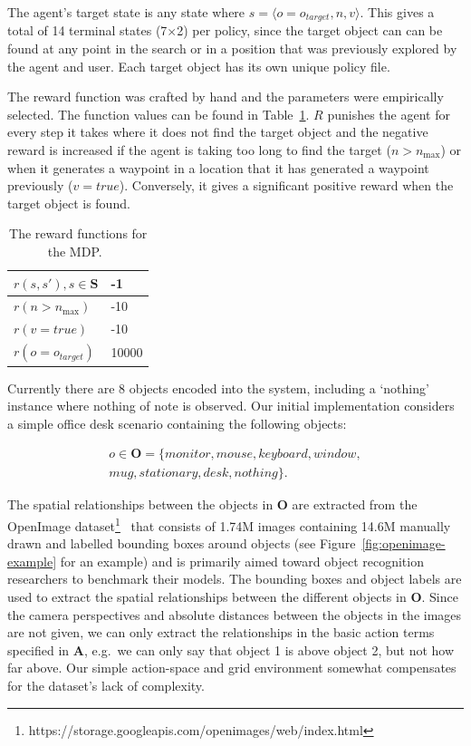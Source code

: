 \documentclass[a4paper, twoside]{article}
\begin{document}
The agent's target state is any state where $s = \langle{}o=o_{target}, n, v\rangle$. This gives a total of 14 terminal states (7$\times$2) per policy, since the target object can can be found at any point in the search or in a position that was previously explored by the agent and user. Each target object has its own unique policy file.

The reward function was crafted by hand and the parameters were empirically selected. The function values can be found in Table~\ref{tab:rewards}. $R$ punishes the agent for every step it takes where it does not find the target object and the negative reward is increased if the agent is taking too long to find the target ($n > n_{\max}$) or when it generates a waypoint in a location that it has generated a waypoint previously ($v = true$). Conversely, it gives a significant positive reward when the target object is found. 

\begin{table}
  \centering
  \caption{The reward functions for the MDP.\ }\label{tab:rewards}
  \begin{tabular}{ll}
    \toprule
    $r(s, s'), s\in\mathbf{S}$ & -1  \\ \midrule
    $r(n > n_{\max})$ & -10 \\ \midrule
    $r(v = true)$  & -10 \\ \midrule
    $r(o = o_{target})$ & 10000 \\ \midrule
    \bottomrule
  \end{tabular}
\end{table}

Currently there are 8 objects encoded into the system, including a `nothing' instance where nothing of note is observed. Our initial implementation considers a simple office desk scenario containing the following objects:

\begin{equation}
  \begin{aligned}
    o\in \mathbf{O} = \{monitor, mouse, keyboard, window,\\mug, stationary, desk, nothing\}.
  \end{aligned}
\end{equation}

The spatial relationships between the objects in $\mathbf{O}$ are extracted from the OpenImage dataset\footnote{https://storage.googleapis.com/openimages/web/index.html}~\cite{openimages} that consists of 1.74M images containing 14.6M manually drawn and labelled bounding boxes around objects (see Figure~\ref{fig:openimage-example} for an example) and is primarily aimed toward object recognition researchers to benchmark their models. The bounding boxes and object labels are used to extract the spatial relationships between the different objects in $\mathbf{O}$. Since the camera perspectives and absolute distances between the objects in the images are not given, we can only extract the relationships in the basic action terms specified in $\mathbf{A}$, e.g.\ we can only say that object 1 is above object 2, but not how far above. Our simple action-space and grid environment somewhat compensates for the dataset's lack of complexity. 
\end{document}
